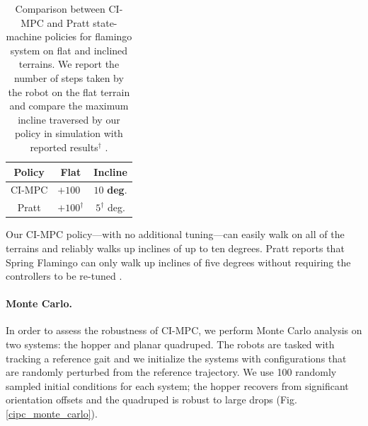 \begin{table}[H]
	\centering
	\caption[Comparison between CI-MPC and Pratt-heuristic policies for biped locomotion]{Comparison between CI-MPC and Pratt state-machine \cite{pratt2000thesis} policies for flamingo system on flat and inclined terrains. We report the number of steps taken by the robot on the flat terrain and compare the maximum incline traversed by our policy in simulation with reported results$^{\dagger}$ \cite{pratt1998intuitive}.}
	
	\begin{tabular}{c c c}
		\toprule
		\textbf{Policy} &
		\textbf{Flat} &
		\textbf{Incline}\\
		\toprule
		CI-MPC & $+100\phantom{^{\dagger}}$ & \boldmath $10$ \unboldmath \textbf{deg}. \\ 
		Pratt & $+100^{\dagger}$ &  $ 5^{\dagger}$  deg. \\ 
		\toprule
	\end{tabular}
	\label{cipc_biped_results}
\end{table}

Our CI-MPC policy---with no additional tuning---can easily walk on all of the terrains and reliably walks up inclines of up to ten degrees. Pratt reports that Spring Flamingo can only walk up inclines of five degrees without requiring the controllers to be re-tuned \cite{pratt1998intuitive}.

\paragraph{Monte Carlo.}
In order to assess the robustness of CI-MPC, we perform Monte Carlo analysis on two systems: the hopper and planar quadruped. The robots are tasked with tracking a reference gait and we initialize the systems with configurations that are randomly perturbed from the reference trajectory. We use 100 randomly sampled initial conditions for each system; the hopper recovers from significant orientation offsets and the quadruped is robust to large drops (Fig. \ref{cipc_monte_carlo}).

